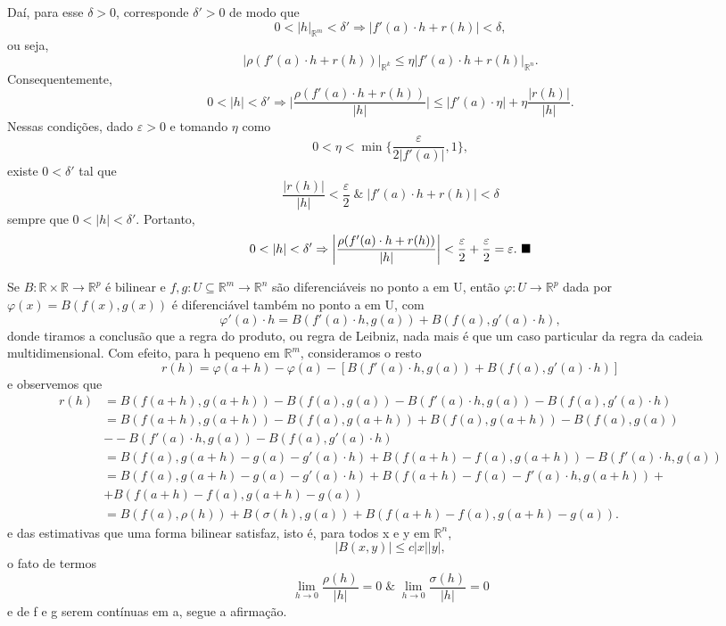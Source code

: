 \documentclass[../analysisII_notes.tex]{subfiles}
\begin{document}
\begin{proof*}
\[	\]
	Daí, para esse \(\delta > 0\), corresponde \(\delta'> 0\) de modo que
	\[
		0 < |h|_{\mathbb{R}^{m}}<\delta' \Rightarrow |f'(a)\cdot h + r(h)| < \delta,
	\]
	ou seja,
	\[
		|\rho(f'(a)\cdot h + r(h))|_{\mathbb{R}^{k}}\leq \eta |f'(a)\cdot h + r(h)|_{\mathbb{R}^{n}}.
	\]
	Consequentemente,
	\[
		0 <|h|<\delta' \Rightarrow \biggl\vert \frac{\rho (f'(a)\cdot h + r(h))}{|h|} \biggr\vert\leq |f'(a)\cdot \eta | + \eta \frac{|r(h)|}{|h|}.
	\]
	Nessas condições, dado \(\varepsilon > 0\) e tomando \(\eta \) como
	\[
		0 < \eta < \min\limits_{}\biggl\{\frac{\varepsilon }{2|f'(a)|}, 1\biggr\},
	\]
	existe \(0 < \delta'\) tal que
	\[
		\frac{|r(h)|}{|h|}<\frac{\varepsilon }{2} \;\&\; |f'(a)\cdot h + r(h)|<\delta
	\]
	sempre que \(0 < |h| < \delta'\). Portanto,
	\[
		0 < |h| < \delta ' \Rightarrow \biggl\vert \frac{\rho(f'(a)\cdot h + r(h))}{|h|} \biggr\vert < \frac{\varepsilon }{2} + \frac{\varepsilon }{2} = \varepsilon . \text{ $\blacksquare$}
	\]
\end{proof*}
\begin{example}
	Se \(B:\mathbb{R}\times \mathbb{R}\rightarrow \mathbb{R}^{p}\) é bilinear e \(f, g:U\subseteq \mathbb{R}^{m}\rightarrow \mathbb{R}^{n}\) são diferenciáveis no ponto a em U, então \(\varphi :U\rightarrow \mathbb{R}^{p}\) dada por \(\varphi (x) = B(f(x), g(x))\) é diferenciável também no ponto a em U, com
	\[
		\varphi'(a)\cdot h = B(f'(a)\cdot h, g(a)) + B(f(a), g'(a)\cdot h),
	\]
	donde tiramos a conclusão que a regra do produto, ou regra de Leibniz, nada mais é que um caso particular da regra da cadeia multidimensional. Com efeito, para h pequeno em \(\mathbb{R}^{m}\), consideramos o resto
	\[
		r(h) = \varphi (a+h)-\varphi (a)-[B(f'(a)\cdot h, g(a)) + B(f(a), g'(a)\cdot h)]
	\]
	e observemos que
	\begin{align*}
		r(h) & =B(f(a+h), g(a+h)) - B(f(a), g(a)) - B(f'(a)\cdot h, g(a)) - B(f(a), g'(a)\cdot h)   \\
		     & =B(f(a+h), g(a+h)) - B(f(a), g(a+h)) + B(f(a), g(a+h))- B(f(a), g(a))                \\
		     & -- B(f'(a)\cdot h, g(a)) - B(f(a), g'(a)\cdot h)                                     \\
		     & = B(f(a), g(a+h)-g(a)-g'(a)\cdot h) + B(f(a+h)-f(a), g(a+h)) - B(f'(a)\cdot h, g(a)) \\
		     & = B(f(a), g(a+h)-g(a)-g'(a)\cdot h) + B(f(a+h)-f(a)-f'(a)\cdot h, g(a+h)) +          \\
		     & + B(f(a+h) - f(a), g(a+h) - g(a))                                                    \\
		     & = B(f(a), \rho (h)) + B(\sigma (h), g(a)) + B(f(a+h)-f(a), g(a+h)-g(a)).
	\end{align*}
	e das estimativas que uma forma bilinear satisfaz, isto é, para todos x e y em \(\mathbb{R}^{n}\),
	\[
		|B(x, y)|\leq c|x||y|,
	\]
	o fato de termos
	\[
		\lim_{h\to 0}\frac{\rho (h)}{|h|}=0\;\&\; \lim_{h\to 0}\frac{\sigma (h)}{|h|} = 0
	\]
	e de f e g serem contínuas em a, segue a afirmação. \qedsymbol
\end{example}
\end{document}
